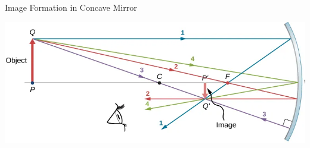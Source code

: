 \documentclass{beamer}
\begin{document}
\begin{frame}{Image Formation in Concave Mirror}
	\begin{center}
		\includegraphics[scale=0.4]{49.png}
	\end{center}
\end{frame}
\end{document}

